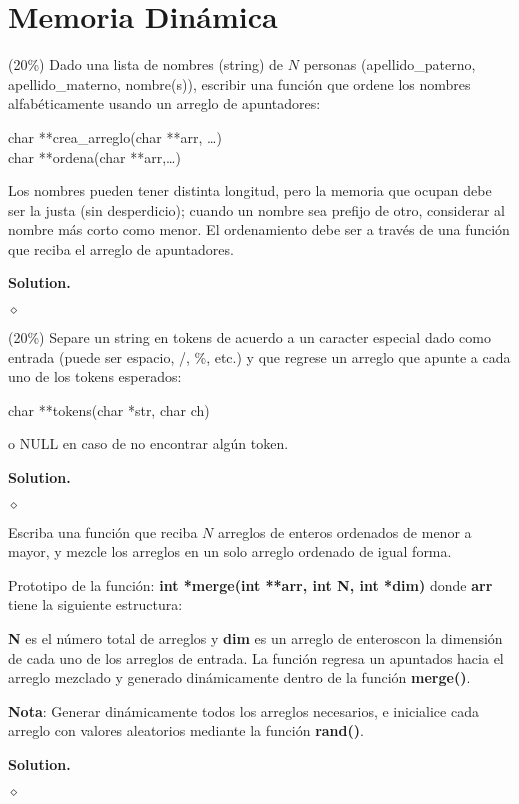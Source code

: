 \documentclass{article}
\theoremstyle{problemstyle}
\newenvironment{solution}{%
  \begin{mdframed}[linewidth=0.8pt,linecolor=Gray,backgroundcolor=Gray!5,roundcorner=5pt, nobreak=true]%
  \noindent\textbf{Solution.}%
}{%
\hfill $ \diamond $ 
  \end{mdframed}%
}
\begin{document}
\section*{Memoria Din\'amica}\label{sec:memoria_din_amica} %
\begin{problem}
(20\%) Dado una lista de nombres (string) de $ N $ personas (apellido\_paterno, apellido\_materno, nombre(s)), escribir una funci\'on que ordene los nombres alfab\'eticamente usando un arreglo de apuntadores:
\begin{center}
	char **crea\_arreglo(char **arr, \dots)\\
	char **ordena(char **arr,\dots)
\end{center}
Los nombres pueden tener distinta longitud, pero la memoria que ocupan debe ser la justa (sin desperdicio); cuando un nombre sea prefijo de otro, considerar al nombre m\'as corto como menor. El ordenamiento debe ser a trav\'es de una funci\'on que reciba el arreglo de apuntadores.
\end{problem}
\begin{solution}

\end{solution}

\begin{problem}
(20\%) Separe un string en tokens de acuerdo a un caracter especial dado como entrada (puede ser espacio, /, \%, etc.) y que regrese un arreglo que apunte a cada uno de los tokens esperados:
\begin{center}
	char **tokens(char *str, char ch)
\end{center}
o NULL en caso de no encontrar alg\'un token.

\end{problem}

\begin{solution}

\end{solution}

\begin{problem}
Escriba una funci\'on que reciba $ N $ arreglos de enteros ordenados de menor a mayor, y mezcle los arreglos en un solo arreglo ordenado de igual forma.

Prototipo de la funci\'on:
\textbf{int *merge(int **arr, int N, int *dim)}
donde \textbf{arr} tiene la siguiente estructura:

\textbf{N} es el n\'umero total de arreglos y \textbf{dim} es un arreglo de enteroscon la dimensi\'on de cada uno de los arreglos de entrada. La funci\'on regresa un apuntados hacia el arreglo mezclado y generado din\'amicamente dentro de la funci\'on \textbf{merge()}.

\textbf{Nota}: Generar din\'amicamente todos los arreglos necesarios, e inicialice cada arreglo con valores aleatorios mediante la funci\'on \textbf{rand()}.
\end{problem}
\begin{solution}

\end{solution}



\end{document}
